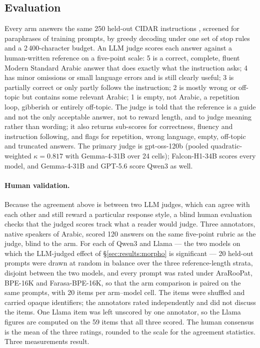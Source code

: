 \documentclass[a4paper,fleqn]{cas-sc}
\begin{document}
\subsection{Evaluation}
\label{sec:protocol:eval}

Every arm answers the same 250 held-out CIDAR instructions \citep{alyafeai2024cidar}, screened for paraphrases of training prompts, by greedy decoding under one set of stop rules and a 2\,400-character budget. An LLM judge scores each answer against a human-written reference on a five-point scale: 5 is a correct, complete, fluent Modern Standard Arabic answer that does exactly what the instruction asks; 4 has minor omissions or small language errors and is still clearly useful; 3 is partially correct or only partly follows the instruction; 2 is mostly wrong or off-topic but contains some relevant Arabic; 1 is empty, not Arabic, a repetition loop, gibberish or entirely off-topic. The judge is told that the reference is a guide and not the only acceptable answer, not to reward length, and to judge meaning rather than wording; it also returns sub-scores for correctness, fluency and instruction following, and flags for repetition, wrong language, empty, off-topic and truncated answers. The primary judge is gpt-oss-120b (pooled quadratic-weighted $\kappa = 0.817$ with Gemma-4-31B over 24 cells); Falcon-H1-34B scores every model, and Gemma-4-31B and GPT-5.6 score Qwen3 as well.

\paragraph{Human validation.}
Because the agreement above is between two LLM judges, which can agree with each other and still reward a particular response style, a blind human evaluation checks that the judged scores track what a reader would judge. Three annotators, native speakers of Arabic, scored 120 answers on the same five-point rubric as the judge, blind to the arm. For each of Qwen3 and Llama --- the two models on which the LLM-judged effect of \S\ref{sec:results:morpho} is significant --- 20 held-out prompts were drawn at random in balance over the three reference-length strata, disjoint between the two models, and every prompt was rated under AraRooPat, BPE-16K and Farasa-BPE-16K, so that the arm comparison is paired on the same prompts, with 20 items per arm--model cell. The items were shuffled and carried opaque identifiers; the annotators rated independently and did not discuss the items. One Llama item was left unscored by one annotator, so the Llama figures are computed on the 59 items that all three scored. The human consensus is the mean of the three ratings, rounded to the scale for the agreement statistics. Three measurements result.
\end{document}
